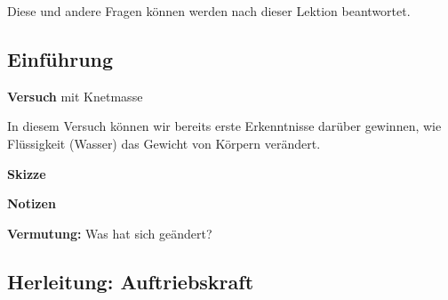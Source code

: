 \documentclass[11pt]{article}
\begin{document}
Diese und andere Fragen können werden nach dieser Lektion beantwortet.

\subsection*{Einführung}


\textbf{Versuch} mit Knetmasse 

In diesem Versuch können wir bereits erste Erkenntnisse darüber gewinnen, wie Flüssigkeit (Wasser) das Gewicht von Körpern verändert. 

\textbf{Skizze}



\textbf{Notizen}


\textbf{Vermutung: }Was hat sich geändert?


\newpage

\subsection*{Herleitung: Auftriebskraft}
\end{document}
